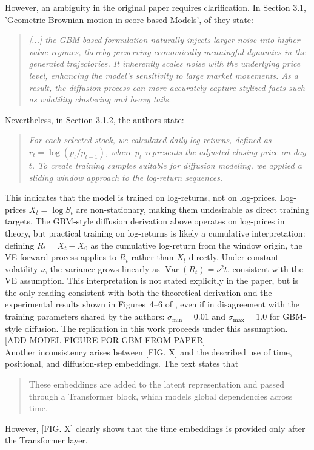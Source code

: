 However, an ambiguity in the original paper requires clarification. In Section 3.1, 'Geometric Brownian motion in score-based Models', of \cite{kim2025diffusion} they state:
\begin{quote}
    \emph{[...] the GBM-based formulation naturally injects larger noise into higher--value regimes, thereby preserving economically meaningful dynamics in the generated trajectories. It inherently scales noise with the underlying price level, enhancing the model’s sensitivity to large market movements. As a result, the diffusion process can more accurately capture stylized facts such as volatility clustering and heavy tails.}
\end{quote}
Nevertheless, in Section 3.1.2, the authors state:
\begin{quote}
    \emph{For each selected stock, we calculated daily log-returns, defined 
    as \(r_t = \log(p_t / p_{t-1})\), where \(p_t\) represents the 
    adjusted closing price on day \(t\). To create training samples 
    suitable for diffusion modeling, we applied a sliding window approach 
    to the log-return sequences.}
\end{quote}
This indicates that the model is trained on log-returns, not on log-prices. 
Log-prices \(X_t = \log S_t\) are non-stationary, making them undesirable 
as direct training targets. The GBM-style diffusion derivation above 
operates on log-prices in theory, but practical training on log-returns 
is likely a cumulative interpretation: defining \(R_t = X_t - X_0\) as the 
cumulative log-return from the window origin, the VE forward process 
applies to \(R_t\) rather than \(X_t\) directly. Under constant volatility 
\(\nu\), the variance grows linearly as \(\operatorname{Var}(R_t) = \nu^2 
t\), consistent with the VE assumption. This interpretation is not stated 
explicitly in the paper, but is the only reading consistent with both the 
theoretical derivation and the experimental results shown in Figures~4--6 of 
\cite{kim2025diffusion}, even if in disagreement with the training parameters shared by the authors: \(\sigma_{\min}=0.01\) and \(\sigma_{\max}=1.0\) for GBM-style diffusion. The replication in this work proceeds under this assumption.\\

[ADD MODEL FIGURE FOR GBM FROM PAPER]\\

Another inconsistency arises between [FIG. X] and the described use of time, positional, and diffusion-step embeddings. The text states that
\begin{quote}
    These embeddings are added to the latent representation and passed through a Transformer block, which models global dependencies across time.
\end{quote}
However, [FIG. X] clearly shows that the time embeddings is provided only after the Transformer layer.\\

